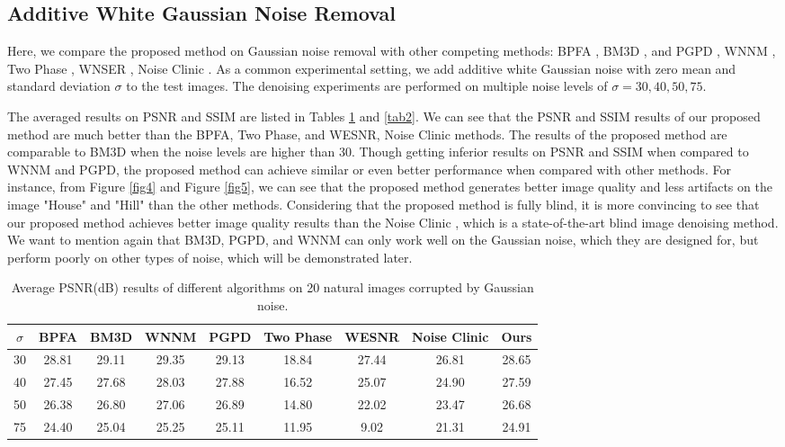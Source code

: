 \documentclass[runningheads]{llncs}
\begin{document}
\vspace{-0.1in}

\subsection{Additive White Gaussian Noise Removal}
Here, we compare the proposed method on Gaussian noise removal with other competing methods: BPFA \cite{bpfa}, BM3D \cite{bm3d}, and PGPD \cite{pgpd}, WNNM \cite{wnnm}, Two Phase \cite{cai2010fast}, WNSER \cite{wesnr}, Noise Clinic \cite{noiseclinic}. As a common experimental setting, we add additive white Gaussian noise with zero mean and standard deviation $\sigma$ to the test images. The denoising experiments are performed on multiple noise levels of $\sigma = 30, 40, 50, 75$.

The averaged results on PSNR and SSIM are listed in Tables \ref{tab1} and \ref{tab2}. We can see that the PSNR and SSIM results of our proposed method are much better than the BPFA, Two Phase, and WESNR, Noise Clinic methods. The results of the proposed method are comparable to BM3D when the noise levels are higher than 30. Though getting inferior results on PSNR and SSIM when compared to WNNM and PGPD, the proposed method can achieve similar or even better performance when compared with other methods. For instance, from Figure \ref{fig4} and Figure \ref{fig5}, we can see that the proposed method generates better image quality and less artifacts on the image "House" and "Hill" than the other methods. Considering that the proposed method is fully blind, it is more convincing to see that our proposed method achieves better image quality results than the Noise Clinic \cite{noiseclinic}, which is a state-of-the-art blind image denoising method. We want to mention again that BM3D, PGPD, and WNNM can only work well on the Gaussian noise, which they are designed for, but perform poorly on other types of noise, which will be demonstrated later. 
\vspace{-0.1in}
\begin{table}
\caption{Average PSNR(dB) results of different algorithms on 20 natural images corrupted by Gaussian noise.}
\vspace{-0.1in}
\label{tab1}
\begin{center}
\renewcommand\arraystretch{1}
\small
\begin{tabular}{|c||c|c|c|c|c|c|c|c|}
\hline
$\sigma$ & \textbf{BPFA} &\textbf{BM3D}&\textbf{WNNM}& \textbf{PGPD} &\textbf{Two Phase} & \textbf{WESNR} &\textbf{Noise Clinic} & \textbf{Ours}
\\
\hline
30 & 28.81 & 29.11 & 29.35 & 29.13 & 18.84 & 27.44 & 26.81 & 28.65 
\\
\hline
40 & 27.45 & 27.68 & 28.03 & 27.88 & 16.52 & 25.07 & 24.90 & 27.59 
\\
\hline
50 & 26.38 & 26.80 & 27.06 & 26.89 & 14.80 & 22.02 & 23.47 & 26.68
\\
\hline
75 & 24.40 & 25.04 & 25.25 & 25.11 & 11.95 & 9.02 & 21.31 & 24.91
\\
\hline
\end{tabular}
\end{center}
\end{table}
\end{document}
